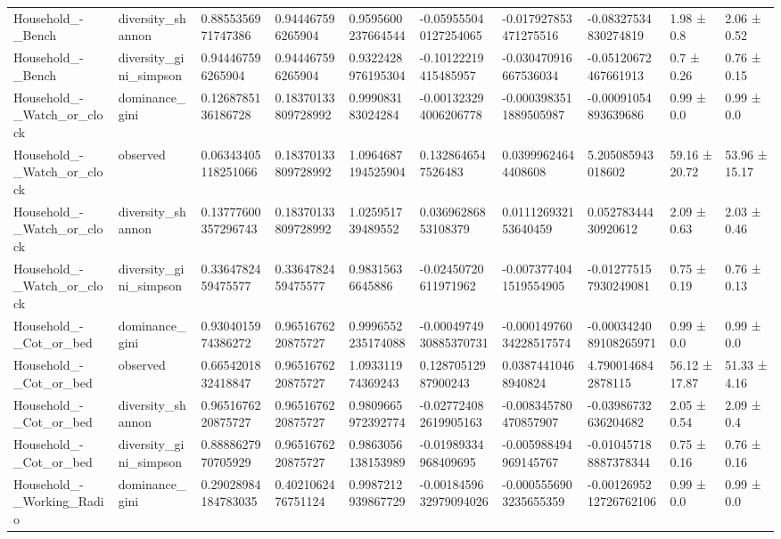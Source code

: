 \begin{longtable}{llllllllll}
Household\_-\_Bench & diversity\_shannon & 0.8855356971747386 & 0.944467596265904 & 0.9595600237664544 & -0.059555040127254065 & -0.017927853471275516 & -0.08327534830274819 & 1.98 ± 0.8 & 2.06 ± 0.52 \\
Household\_-\_Bench & diversity\_gini\_simpson & 0.944467596265904 & 0.944467596265904 & 0.9322428976195304 & -0.10122219415485957 & -0.030470916667536034 & -0.05120672467661913 & 0.7 ± 0.26 & 0.76 ± 0.15 \\
Household\_-\_Watch\_or\_clock & dominance\_gini & 0.1268785136186728 & 0.18370133809728992 & 0.999083183024284 & -0.001323294006206778 & -0.0003983511889505987 & -0.00091054893639686 & 0.99 ± 0.0 & 0.99 ± 0.0 \\
Household\_-\_Watch\_or\_clock & observed & 0.06343405118251066 & 0.18370133809728992 & 1.0964687194525904 & 0.1328646547526483 & 0.03999624644408608 & 5.205085943018602 & 59.16 ± 20.72 & 53.96 ± 15.17 \\
Household\_-\_Watch\_or\_clock & diversity\_shannon & 0.13777600357296743 & 0.18370133809728992 & 1.025951739489552 & 0.03696286853108379 & 0.011126932153640459 & 0.05278344430920612 & 2.09 ± 0.63 & 2.03 ± 0.46 \\
Household\_-\_Watch\_or\_clock & diversity\_gini\_simpson & 0.3364782459475577 & 0.3364782459475577 & 0.98315636645886 & -0.02450720611971962 & -0.0073774041519554905 & -0.012775157930249081 & 0.75 ± 0.19 & 0.76 ± 0.13 \\
Household\_-\_Cot\_or\_bed & dominance\_gini & 0.9304015974386272 & 0.9651676220875727 & 0.9996552235174088 & -0.0004974930885370731 & -0.00014976034228517574 & -0.0003424089108265971 & 0.99 ± 0.0 & 0.99 ± 0.0 \\
Household\_-\_Cot\_or\_bed & observed & 0.6654201832418847 & 0.9651676220875727 & 1.093311974369243 & 0.12870512987900243 & 0.03874410468940824 & 4.7900146842878115 & 56.12 ± 17.87 & 51.33 ± 4.16 \\
Household\_-\_Cot\_or\_bed & diversity\_shannon & 0.9651676220875727 & 0.9651676220875727 & 0.9809665972392774 & -0.027724082619905163 & -0.008345780470857907 & -0.03986732636204682 & 2.05 ± 0.54 & 2.09 ± 0.4 \\
Household\_-\_Cot\_or\_bed & diversity\_gini\_simpson & 0.8888627970705929 & 0.9651676220875727 & 0.9863056138153989 & -0.01989334968409695 & -0.005988494969145767 & -0.010457188887378344 & 0.75 ± 0.16 & 0.76 ± 0.16 \\
Household\_-\_Working\_Radio & dominance\_gini & 0.29028984184783035 & 0.4021062476751124 & 0.9987212939867729 & -0.0018459632979094026 & -0.0005556903235655359 & -0.0012695212726762106 & 0.99 ± 0.0 & 0.99 ± 0.0 \\

\end{longtable}
